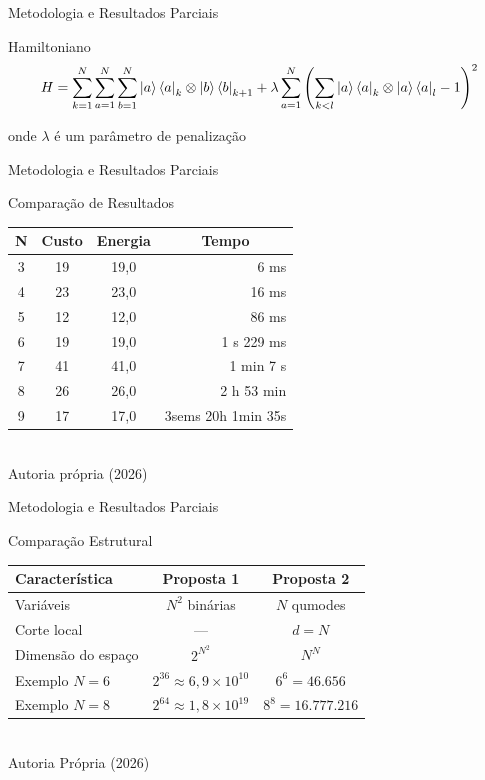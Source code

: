 \documentclass[xcolor={dvipsnames,table}]{beamer}
\begin{document}
\begin{frame}{Metodologia e Resultados Parciais}
\begin{block}{Hamiltoniano}
    $$H=\sum_{k=1}^{N} \sum_{a=1}^{N}\sum_{b=1}^{N} \ket{a}\bra{a}_k\otimes\ket{b}\bra{b}_{k+1} +\lambda \sum_{a=1}^{N}\left(\sum_{k<l} \ket{a}\bra{a}_k\otimes \ket{a}\bra{a}_l -1\right)^2$$

    onde $\lambda$ é um parâmetro de penalização
\end{block}
\end{frame}

\begin{frame}{Metodologia e Resultados Parciais}
    \begin{block}{Comparação de Resultados}
        \centering
        \begin{tabular}{|c|c|c|r|}
    \hline
    \textbf{N} & \textbf{Custo} & \textbf{Energia} & \multicolumn{1}{c|}{\textbf{Tempo}} \\ \hline
    3 & 19 & 19,0 & 6 ms \\ \hline
    4 & 23 & 23,0 & 16 ms \\ \hline
    5 & 12 & 12,0 & 86 ms \\ \hline
    6 & 19 & 19,0 & 1 s 229 ms \\ \hline
    7 & 41 & 41,0 & 1 min 7 s \\ \hline
    8 & 26 & 26,0 & 2 h 53 min \\ 
    \hline
    9 & 17 & 17,0 & 3sems 20h 1min 35s\\ \hline
    \end{tabular}\\ 
    \tiny{Autoria própria (2026)}
    \end{block}
\end{frame}

\begin{frame}{Metodologia e Resultados Parciais}

    \begin{block}{Comparação Estrutural}
        \centering
        \begin{tabular}{lcc}
        \hline
        \textbf{Característica} & \textbf{Proposta 1} & 
        \textbf{Proposta 2} \\
        \hline
        Variáveis & $N^2$ binárias & $N$ qumodes \\
        Corte local & --- & $d = N$ \\
        Dimensão do espaço & $2^{N^2}$ & $N^N$ \\
        Exemplo $N=6$ & $2^{36} \approx 6{,}9 \times 10^{10}$ & 
        $6^6 = 46.656$ \\
        Exemplo $N=8$ & $2^{64} \approx 1{,}8 \times 10^{19}$ & 
        $8^8 = 16.777.216$ \\
        \hline
        \end{tabular} \\
        \tiny{Autoria Própria (2026)}
    \end{block}
\end{frame}
\end{document}
